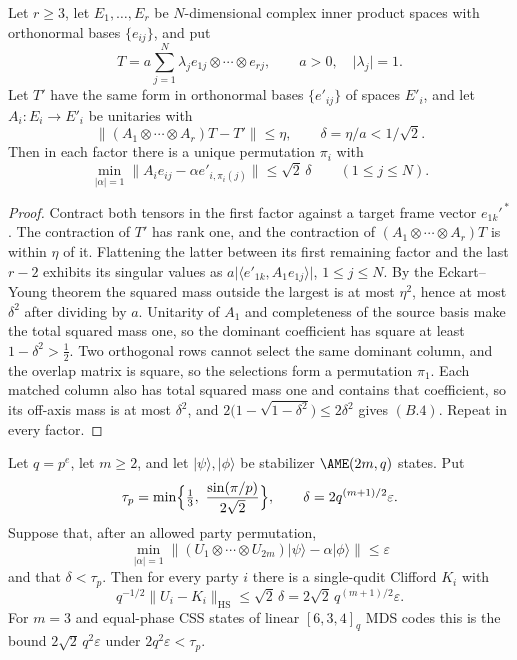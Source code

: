 \begin{lemma}
\label{lem:quantitative-axes}
Let \(r\geq3\), let \(E_1,\ldots,E_r\) be \(N\)-dimensional complex inner
product spaces with orthonormal bases \(\{e_{ij}\}\), and put
\[
 T=a\sum_{j=1}^N\lambda_je_{1j}\otimes\cdots\otimes e_{rj},
 \qquad a>0,\quad\lvert\lambda_j\rvert=1 .
\]
Let \(T'\) have the same form in orthonormal bases \(\{e'_{ij}\}\) of
spaces \(E'_i\), and let \(A_i:E_i\to E'_i\) be unitaries with
\[
 \lVert(A_1\otimes\cdots\otimes A_r)T-T'\rVert\leq\eta,
 \qquad\delta=\eta/a<1/\sqrt2 .
\]
Then in each factor there is a unique permutation \(\pi_i\) with
\[
 \min_{\lvert\alpha\rvert=1}
 \lVert A_ie_{ij}-\alpha e'_{i,\pi_i(j)}\rVert\leq\sqrt2\,\delta
 \qquad(1\leq j\leq N).                                  \tag{B.4}
\]
\end{lemma}

\begin{proof}
Contract both tensors in the first factor against a target frame vector
\(e_{1k}'^{\,*}\).  The contraction of \(T'\) has rank one, and the
contraction of \((A_1\otimes\cdots\otimes A_r)T\) is within \(\eta\) of it.
Flattening the latter between its first remaining factor and the last
\(r-2\) exhibits its singular values as
\(a\lvert\langle e'_{1k},A_1e_{1j}\rangle\rvert\), \(1\leq j\leq N\).  By
the Eckart--Young theorem the squared mass outside the largest is at most
\(\eta^2\), hence at most \(\delta^2\) after dividing by \(a\).
Unitarity of \(A_1\) and completeness of the source basis make the total
squared mass one, so the dominant coefficient has square at least
\(1-\delta^2>\frac12\).  Two orthogonal rows cannot select the same
dominant column, and the overlap matrix is square, so the selections form a
permutation \(\pi_1\).  Each matched column also has total squared mass one
and contains that coefficient, so its off-axis mass is at most
\(\delta^2\), and \(2\bigl(1-\sqrt{1-\delta^2}\bigr)\leq2\delta^2\) gives
\((B.4)\).  Repeat in every factor.
\end{proof}

\begin{proposition}
\label{prop:quantitative-intertwiner}
Let \(q=p^e\), let \(m\geq2\), and let
\(\lvert\psi\rangle,\lvert\phi\rangle\) be stabilizer \(\AME(2m,q)\)
states.  Put
\[
 \tau_p=\min\Bigl\{\tfrac13,\ \frac{\sin(\pi/p)}{2\sqrt2}\Bigr\},
 \qquad
 \delta=2q^{(m+1)/2}\varepsilon .
\]
Suppose that, after an allowed party permutation,
\[
 \min_{\lvert\alpha\rvert=1}
 \bigl\lVert(U_1\otimes\cdots\otimes U_{2m})\lvert\psi\rangle
   -\alpha\lvert\phi\rangle\bigr\rVert\leq\varepsilon
\]
and that \(\delta<\tau_p\).  Then for every party \(i\) there is a
single-qudit Clifford \(K_i\) with
\[
 q^{-1/2}\lVert U_i-K_i\rVert_{\mathrm{HS}}
  \leq\sqrt2\,\delta=2\sqrt2\,q^{(m+1)/2}\varepsilon .    \tag{B.5}
\]
For \(m=3\) and equal-phase CSS states of linear \([6,3,4]_q\) MDS codes
this is the bound \(2\sqrt2\,q^2\varepsilon\) under \(2q^2\varepsilon<\tau_p\).
\end{proposition}

